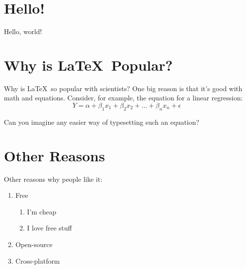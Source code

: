 \documentclass{article}
\begin{document}
\section{Hello!}
Hello, world! \\

\section{Why is \LaTeX\ Popular?}
Why is \LaTeX\ so popular with scientists? One big reason is that it's good with math and equations. Consider, for example, the equation for a linear regression: $$Y = \alpha + \beta_1x_1 + \beta_2x_2 + \ldots + \beta_nx_n + \epsilon$$

Can you imagine any easier way of typesetting such an equation? \\

\section{Other Reasons}
\noindent
Other reasons why people like it:
\begin{enumerate}
	\item{Free}
	\begin{enumerate}
			\item{I'm cheap}
			\item{I love free stuff}
	\end{enumerate}
	\item{Open-source}
	\item{Cross-platform}
\end{enumerate}
	
\end{document}

